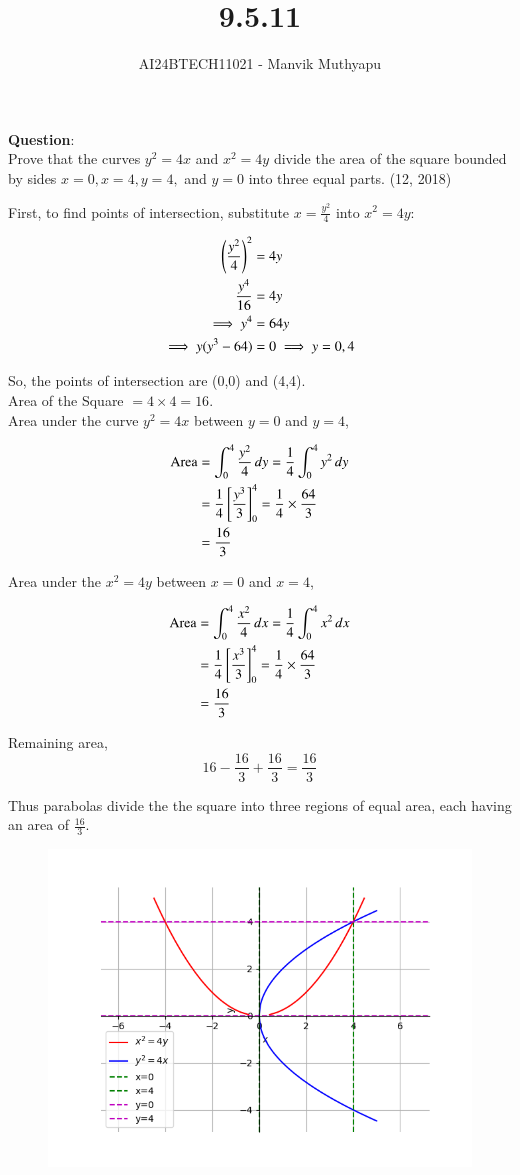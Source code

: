 \documentclass[journal,12pt,onecolumn]{IEEEtran}
\title{9.5.11}
\author{AI24BTECH11021 - Manvik Muthyapu}
\theoremstyle{remark}
\begin{document}


\maketitle
\bigskip

\renewcommand{\thefigure}{\theenumi}
\renewcommand{\thetable}{\theenumi}


\textbf{Question}:\\
Prove that the curves $y^2 = 4x$ and $x^2 = 4y$ divide the area of the square bounded by sides $x=0, x=4, y=4,$ and $y=0$ into three equal parts.
\hfill{(12, 2018)}

\solution
First, to find points of intersection, substitute $x = \frac{y^2}{4}$ into $x^2 = 4y$:

\begin{align}
	\left(\frac{y^2}{4}\right)^2 &= 4y \\
	\frac{y^4}{16} &= 4y \\
	\implies y^4 &= 64y \\
	\implies y(y^3 - 64) &= 0 \implies y = 0,4
\end{align}

So, the points of intersection are (0,0) and (4,4). \\
Area of the Square $= 4 \times 4 = 16$.\\ 
Area under the curve $y^2 = 4x$ between $y = 0$ and $y = 4$,

\begin{align}
	\text{Area} &= \int_0^4 \frac{y^2}{4} \, dy = \frac{1}{4} \int_0^4 y^2 \, dy \\
	&= \frac{1}{4} {}\left[\frac{y^3}{3}\right]_0^4 = \frac{1}{4} \times \frac{64}{3} \\
	&= \frac{16}{3}
\end{align}

Area under the $x^2 = 4y$ between $x = 0$ and $x = 4$,

\begin{align}
	\text{Area} &= \int_0^4 \frac{x^2}{4} \, dx = \frac{1}{4} \int_0^4 x^2 \, dx \\
	&= \frac{1}{4} {}\left[\frac{x^3}{3}\right]_0^4 = \frac{1}{4} \times \frac{64}{3} \\
	&= \frac{16}{3}
\end{align}

Remaining area,
$$16 - \frac{16}{3} + \frac{16}{3} = \frac{16}{3}$$

Thus parabolas divide the the square into three regions of equal area, each having an area of $\frac{16}{3}$.

\begin{figure}[h!]
	\centering
	\includegraphics[width=0.7\linewidth]{figs/plot.png}
\end{figure}
\end{document}
